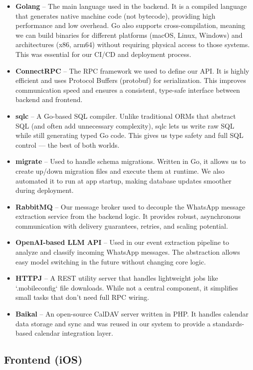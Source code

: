 \begin{itemize}
    \item \textbf{Golang} – The main language used in the backend. It is a compiled language that generates native machine code (not bytecode), providing high performance and low overhead. Go also supports cross-compilation, meaning we can build binaries for different platforms (macOS, Linux, Windows) and architectures (x86, arm64) without requiring physical access to those systems. This was essential for our CI/CD and deployment process.
    \item \textbf{ConnectRPC} – The RPC framework we used to define our API. It is highly efficient and uses Protocol Buffers (protobuf) for serialization. This improves communication speed and ensures a consistent, type-safe interface between backend and frontend.
    \item \textbf{sqlc} – A Go-based SQL compiler. Unlike traditional ORMs that abstract SQL (and often add unnecessary complexity), sqlc lets us write raw SQL while still generating typed Go code. This gives us type safety and full SQL control — the best of both worlds.
    \item \textbf{migrate} – Used to handle schema migrations. Written in Go, it allows us to create up/down migration files and execute them at runtime. We also automated it to run at app startup, making database updates smoother during deployment.
    \item \textbf{RabbitMQ} – Our message broker used to decouple the WhatsApp message extraction service from the backend logic. It provides robust, asynchronous communication with delivery guarantees, retries, and scaling potential.
    \item \textbf{OpenAI-based LLM API} – Used in our event extraction pipeline to analyze and classify incoming WhatsApp messages. The abstraction allows easy model switching in the future without changing core logic.
    \item \textbf{HTTPJ} – A REST utility server that handles lightweight jobs like `.mobileconfig` file downloads. While not a central component, it simplifies small tasks that don’t need full RPC wiring.
    \item \textbf{Baikal} – An open-source CalDAV server written in PHP. It handles calendar data storage and sync and was reused in our system to provide a standards-based calendar integration layer.
\end{itemize}

\subsection{Frontend (iOS)}


